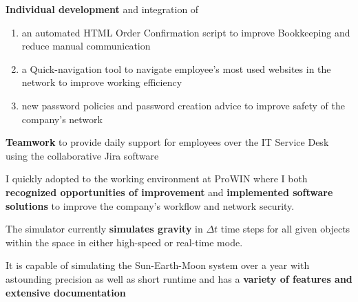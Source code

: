 \documentclass[]{jonas-cv}
\begin{document}
\hfill
\begin{minipage}[t]{0.63\textwidth} 



\sectionsep

\begin{tightemize}
    \item \textbf{Individual development} and integration of
    \begin{enumerate}
        \parskip=0.0em
        \item an automated HTML Order Confirmation script to improve Bookkeeping and reduce manual communication
        \item a Quick-navigation tool to navigate employee's most used websites in the network to improve working efficiency
        \item new password policies and password creation advice to improve safety of the company's network
    \end{enumerate}
    \item \textbf{Teamwork} to provide daily support for employees over the IT Service Desk using the collaborative Jira software
    \vspace{2mm}
    
    \item [\faicon{angle-double-right}] I quickly adopted to the working environment at ProWIN where I both \textbf{recognized opportunities of improvement} 
    and \textbf{implemented software solutions} to improve the company's workflow and network security.
\end{tightemize}
\largesectionsep




\begin{tightemize}
    \item The simulator currently \textbf{simulates gravity} in $\Delta t$ time steps for all given objects within the space in either high-speed or real-time mode.
    \item It is capable of simulating the Sun-Earth-Moon system over a year with astounding precision as well as short runtime and has a \textbf{variety of features and extensive documentation}
\end{tightemize}
\largesectionsep


\end{minipage}
\end{document}
